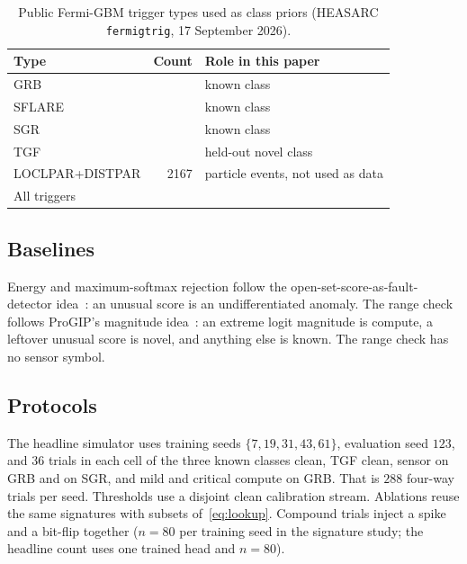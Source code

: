 \documentclass[preprint,12pt]{elsarticle}
\begin{document}
\begin{table}[t]
\caption{Public Fermi-GBM trigger types used as class priors (HEASARC \texttt{fermigtrig}, 17 September 2026).}
\label{tab:cat}
\centering
\begin{tabular}{lrl}
\toprule
Type & Count & Role in this paper \\
\midrule
GRB & \CatalogGRB{} & known class \\
SFLARE & \CatalogSflare{} & known class \\
SGR & \CatalogSGR{} & known class \\
TGF & \CatalogTGF{} & held-out novel class \\
LOCLPAR+DISTPAR & 2167 & particle events, not used as data \\
All triggers & \CatalogTotal{} & \\
\bottomrule
\end{tabular}
\end{table}

\subsection{Baselines}

Energy and maximum-softmax rejection follow the open-set-score-as-fault-detector idea~\cite{gavarini2022,hendrycks2017,liu2020}: an unusual score is an undifferentiated anomaly. The range check follows ProGIP's magnitude idea~\cite{progip2025}: an extreme logit magnitude is compute, a leftover unusual score is novel, and anything else is known. The range check has no sensor symbol.

\subsection{Protocols}

The headline simulator uses training seeds $\{7,19,31,43,61\}$, evaluation seed $123$, and $36$ trials in each cell of the three known classes clean, TGF clean, sensor on GRB and on SGR, and mild and critical compute on GRB. That is $288$ four-way trials per seed. Thresholds use a disjoint clean calibration stream. Ablations reuse the same signatures with subsets of~\eqref{eq:lookup}. Compound trials inject a spike and a bit-flip together ($n=80$ per training seed in the signature study; the headline count uses one trained head and $n=80$).
\end{document}
